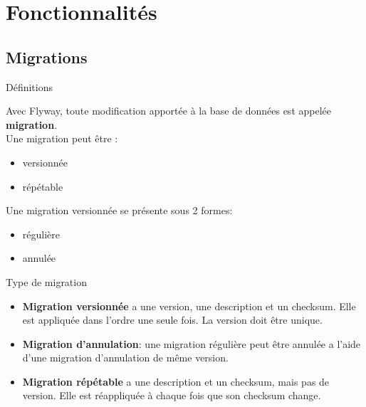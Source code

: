 \documentclass[slidestop,compress,11pt,xcolor=dvipsnames,french]{beamer}
\begin{document}
\section{Fonctionnalités}
\subsection*{Migrations}
\begin{frame}{Définitions}

Avec Flyway, toute modification apportée à la base de données est appelée \textbf{migration}. \\
Une migration peut être : 
\begin{itemize}
 \item versionnée
 \item répétable
\end{itemize}

Une migration versionnée se présente sous 2 formes:
\begin{itemize}
 \item régulière
 \item annulée
\end{itemize}

\end{frame}

\begin{frame}{Type de migration}

\begin{itemize}
 \item \textbf{Migration versionnée} a une version, une description et un checksum. Elle est appliquée dans l'ordre une seule fois. La version doit être unique.
 \item \textbf{Migration d'annulation}: une migration régulière peut être annulée a l'aide d'une migration d'annulation de même version. 
 \item \textbf{Migration répétable} a une description et un checksum, mais pas de version. Elle est réappliquée à chaque fois que son checksum change. 

\end{itemize}
\end{frame}
\end{document}
